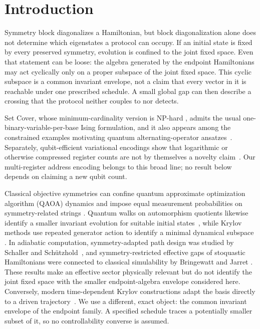 \section{Introduction}
\label{sec:rewrite-intro}

Symmetry block diagonalizes a Hamiltonian, but block diagonalization alone
does not determine which eigenstates a protocol can occupy.  If an initial
state is fixed by every preserved symmetry, evolution is confined to the
joint fixed space.  Even that statement can be loose: the algebra generated
by the endpoint Hamiltonians may act cyclically only on a proper subspace of
the joint fixed space.  This cyclic subspace is a common invariant envelope,
not a claim that every vector in it is reachable under one prescribed
schedule.  A small global gap can then describe a crossing that the protocol
neither couples to nor detects.

Set Cover, whose minimum-cardinality version is NP-hard
\cite{karp1972reducibility}, admits the usual one-binary-variable-per-base Ising formulation,
and it also appears among the constrained examples motivating quantum
alternating-operator ansatzes~\cite{Lucas2014,Hadfield2019}.  Separately,
qubit-efficient variational encodings show that logarithmic or otherwise
compressed register counts are not by themselves a novelty
claim~\cite{TanEncoding2021,GlosKrawiecZimboras2022,Chancellor2019}.  Our
multi-register address encoding belongs to this broad line; no result below
depends on claiming a new qubit count.

Classical objective symmetries can confine quantum approximate optimization
algorithm (QAOA) dynamics and impose equal measurement probabilities on
symmetry-related strings
\cite{ShaydulinHadfieldHoggSafro2021}.  Quantum walks on automorphism
quotients likewise identify a smaller invariant evolution for suitable
initial states~\cite{KroviBrun2007}, while Krylov methods use repeated
generator action to identify a minimal dynamical subspace
\cite{Saad1992}.  In adiabatic computation, symmetry-adapted path design was
studied by Schaller and Sch\"utzhold~\cite{SchallerSchuetzhold2010}, and
symmetry-restricted effective gaps of stoquastic Hamiltonians were connected
to classical simulability by Bringewatt and Jarret
\cite{BringewattJarret2020}.  These results make an effective sector
physically relevant but do not identify the joint fixed space with the
smaller endpoint-algebra envelope considered here.  Conversely, modern
time-dependent Krylov constructions adapt the basis directly to a driven
trajectory~\cite{TakahashiDelCampo2025}.  We use a different, exact object:
the common invariant envelope of the endpoint family.  A specified schedule
traces a potentially smaller subset of it, so no controllability converse is
assumed.

